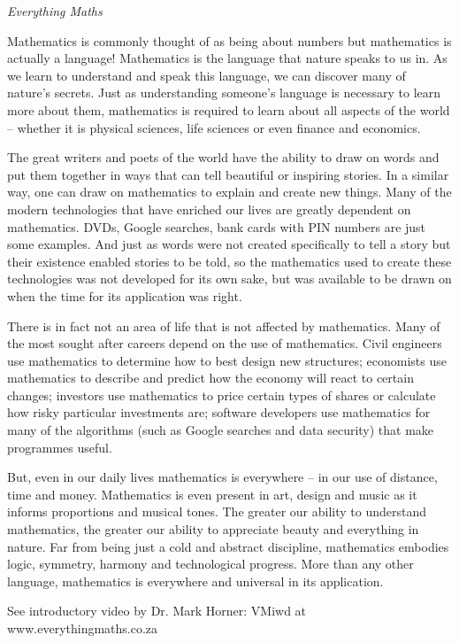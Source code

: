 \newpage
\thispagestyle{empty}

{\normalfont\sffamily\fontsize{22}\normalfont\itshape Everything Maths} \par

{ \Large
Mathematics is commonly thought of as being about numbers but mathematics is actually a language! Mathematics is the language that nature speaks to us in. As we learn to understand and speak this language, we can discover many of nature’s secrets. Just as understanding someone’s language is necessary to learn more about them, mathematics is required to learn about all aspects of the world -- whether it is physical sciences, life sciences or even finance and economics.\par


The great writers and poets of the world have the ability to draw on words and put them together in
ways that can tell beautiful or inspiring stories. In a similar way, one can draw on mathematics to
explain and create new things. Many of the modern technologies that have enriched our lives are
greatly dependent on mathematics. DVDs, Google searches, bank cards with PIN numbers are just
some examples. And just as words were not created specifically to tell a story but their existence enabled
stories to be told, so the mathematics used to create these technologies was not developed for its own sake,
but was available to be drawn on when the time for its application was right.\par


There is in fact not an area of life that is not affected by mathematics. Many of the most sought after
careers depend on the use of mathematics. Civil engineers use mathematics to determine how to best
design new structures; economists use mathematics to describe and predict how the economy will react
to certain changes; investors use mathematics to price certain types of shares or calculate how risky
particular investments are; software developers use mathematics for many of the algorithms (such as
Google searches and data security) that make programmes useful.\par



But, even in our daily lives mathematics is everywhere – in our use of distance, time and money.
Mathematics is even present in art, design and music as it informs proportions and musical tones. The
greater our ability to understand mathematics, the greater our ability to appreciate beauty and
everything in nature. Far from being just a cold and abstract discipline, mathematics
embodies logic, symmetry, harmony and technological progress. More than any other language,
mathematics is everywhere and universal in its application.\par


See introductory video by Dr. Mark Horner:  VMiwd at www.everythingmaths.co.za



}





